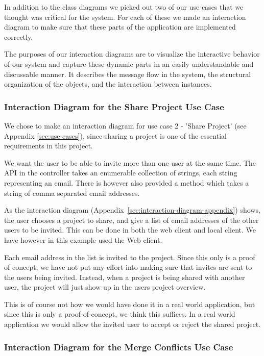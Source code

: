 In addition to the class diagrams we picked out two of our use cases that we thought was  critical for the system. For each of these we made an interaction diagram to make sure that these parts of the application are implemented correctly. 

The purposes of our interaction diagrams are to visualize the interactive behavior of our system and capture these dynamic parts in an easily understandable and discussable manner. It describes the message flow in the system, the structural organization
of the objects, and the interaction between instances.

\subsubsection{Interaction Diagram for the Share Project Use Case}

We chose to make an interaction diagram for use case 2 - 'Share Project' (see Appendix \ref{sec:use-cases}), since sharing a project is one of the essential
requirements in this project.

We want the user to be able to invite more than one user at the same time. The API in the controller takes an enumerable collection of strings, each string
representing an email. There is however also provided a method which takes a string of comma separated email addresses.

As the interaction diagram (Appendix~\ref{sec:interaction-diagram-appendix}) shows, the user chooses a project to share, and give a list of email
addresses of the other users to be invited. This can be done in both the web client and local client. We have however in this example used the Web client.

Each email address in the list is invited to the project. Since this only is a proof of concept, we have not put any effort into making sure that invites 
are sent to the users being invited. Instead, when a project is being shared with another user, the project will just show up in the users project overview.

This is of course not how we would have done it in a real world application, but since this is only a proof-of-concept, we think this suffices. In a 
real world application we would allow the invited user to accept or reject the shared project.

\subsubsection{Interaction Diagram for the Merge Conflicts Use Case}

